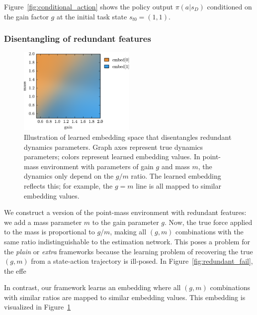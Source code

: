 \documentclass{article}
\newcommand{\plain}{\emph{plain}}
\newcommand{\extra}{\emph{extra}}
\begin{document}
Figure~\ref{fig:conditional_action} shows the policy output $\pi(a|s_D)$ conditioned on
the gain factor $g$ at the initial task state $s_{t0} = (1, 1)$.

\subsubsection{Disentangling of redundant features}

\begin{figure}
\centering
\includegraphics[width=0.5\textwidth]{embed_colors.pdf}
\caption{
Illustration of learned embedding space that disentangles redundant dynamics parameters.
Graph axes represent true dynamics parameters; colors represent learned embedding values.
In point-mass environment with parameters of gain $g$ and mass $m$,
the dynamics only depend on the $g/m$ ratio.
The learned embedding reflects this; for example, the $g=m$ line is all mapped to similar embedding values.
}
\label{fig:embed_colors}
\end{figure}
We construct a version of the point-mass environment with redundant features:
we add a mass parameter $m$ to the gain parameter $g$.
Now, the true force applied to the mass is proportional to $g/m$,
making all $(g, m)$ combinations with the same ratio indistinguishable to the estimation network.
This poses a problem for the \plain{} or \extra{} frameworks
because the learning problem of recovering the true $(g, m)$ from a state-action trajectory is ill-posed.
In Figure~\ref{fig:redundant_fail}, the effe

In contrast, our framework learns an embedding where all $(g, m)$ combinations with similar ratios are mapped to similar embedding values.
This embedding is visualized in Figure~\ref{fig:embed_colors}
\end{document}
